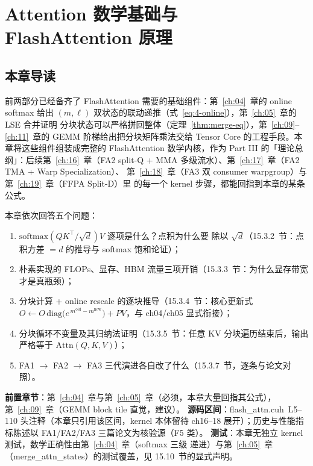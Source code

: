 \providecommand{\url}[1]{\texttt{#1}}
\chapter{Attention 数学基础与 FlashAttention 原理}\label{ch:15}

\section{本章导读}

前两部分已经备齐了 FlashAttention 需要的基础组件：第~\ref{ch:04}~章的 online softmax 给出
$(m,\ell)$ 双状态的联动递推（式~\ref{eq:4-online}），第~\ref{ch:05}~章的 LSE 合并证明
分块状态可以严格拼回整体（定理~\ref{thm:merge-eq}），第~\ref{ch:09}--\ref{ch:11}~章的
GEMM 阶梯给出把分块矩阵乘法交给 Tensor Core 的工程手段。本章将这些组件组装成完整的
FlashAttention 数学内核，作为 Part III 的「理论总纲」：后续第~\ref{ch:16}~章（FA2
split-Q + MMA 多级流水）、第~\ref{ch:17}~章（FA2 TMA + Warp Specialization）、
第~\ref{ch:18}~章（FA3 双 consumer warpgroup）与第~\ref{ch:19}~章（FFPA Split-D）里
的每一个 kernel 步骤，都能回指到本章的某条公式。

本章依次回答五个问题：
\begin{enumerate}[itemsep=0pt,topsep=2pt]
  \item $\mathrm{softmax}\!\left(QK^{\top}/\sqrt{d}\right)V$ 逐项是什么？点积为什么要
        除以 $\sqrt{d}$（15.3.2~节：点积方差 $=d$ 的推导与 softmax 饱和论证）；
  \item 朴素实现的 FLOPs、显存、HBM 流量三项开销（15.3.3~节：为什么显存带宽才是真瓶颈）；
  \item 分块计算 + online rescale 的逐块推导（15.3.4~节：核心更新式
        $O \leftarrow O\,\mathrm{diag}\bigl(e^{\,m^{\mathrm{old}}-m^{\mathrm{new}}}\bigr)
        + PV$，与 ch04/ch05 显式衔接）；
  \item 分块循环不变量及其归纳法证明（15.3.5~节：任意 KV 分块遍历结束后，输出严格等于
        $\mathrm{Attn}(Q,K,V)$）；
  \item FA1 $\to$ FA2 $\to$ FA3 三代演进各自改了什么（15.3.7~节，逐条与论文对照）。
\end{enumerate}

\textbf{前置章节}：第~\ref{ch:04}~章与第~\ref{ch:05}~章（必须，本章大量回指其公式），
第~\ref{ch:09}~章（GEMM block tile 直觉，建议）。
\textbf{源码区间}：flash\_attn.cuh~L5--110 头注释（本章只引用该区间，kernel 本体留待
ch16--18 展开）；历史与性能指标陈述以 FA1/FA2/FA3 三篇论文为核验源（F5 类）。
\textbf{测试}：本章无独立 kernel 测试，数学正确性由第~\ref{ch:04}~章（softmax 三级
递进）与第~\ref{ch:05}~章（merge\_attn\_states）的测试覆盖，见 15.10~节的显式声明。

